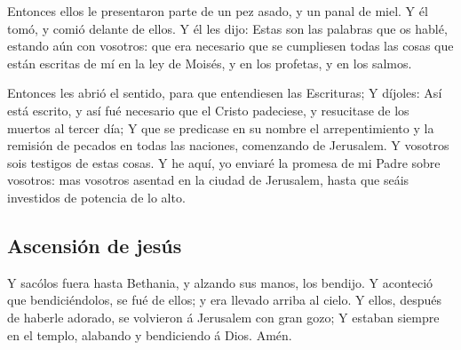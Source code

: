  Entonces ellos le presentaron parte de un pez asado, y
un panal de miel.  Y él tomó, y comió delante de ellos.
 Y él les dijo: Estas son las palabras que os hablé,
estando aún con vosotros: que era necesario que se cumpliesen todas las
cosas que están escritas de mí en la ley de Moisés, y en los profetas, y
en los salmos.

 Entonces les abrió el sentido, para que entendiesen las
Escrituras;  Y díjoles: Así está escrito, y así fué
necesario que el Cristo padeciese, y resucitase de los muertos al tercer
día;  Y que se predicase en su nombre el arrepentimiento
y la remisión de pecados en todas las naciones, comenzando de Jerusalem.
 Y vosotros sois testigos de estas cosas. 
Y he aquí, yo enviaré la promesa de mi Padre sobre vosotros: mas
vosotros asentad en la ciudad de Jerusalem, hasta que seáis investidos
de potencia de lo alto.

\hypertarget{ascensiuxf3n-de-jesuxfas}{%
\subsection{Ascensión de jesús}\label{ascensiuxf3n-de-jesuxfas}}

 Y sacólos fuera hasta Bethania, y alzando sus manos, los
bendijo.  Y aconteció que bendiciéndolos, se fué de
ellos; y era llevado arriba al cielo.  Y ellos, después
de haberle adorado, se volvieron á Jerusalem con gran gozo;
 Y estaban siempre en el templo, alabando y bendiciendo á
Dios. Amén.

